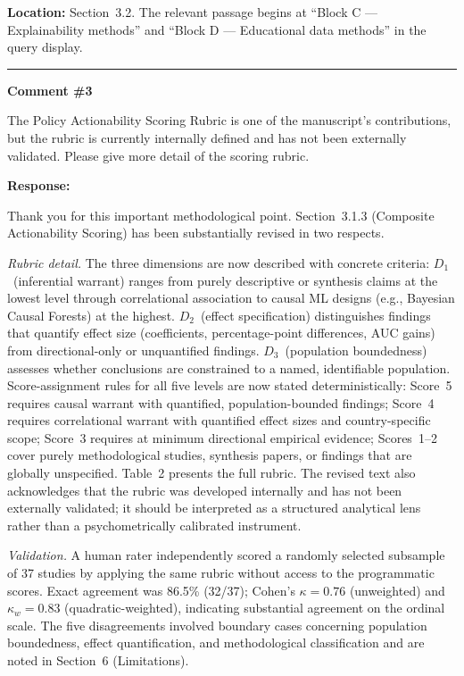 \documentclass[12pt, a4paper]{article}
\begin{document}
\medskip
\noindent\textbf{Location:} Section~3.2. The relevant passage begins at ``Block C --- Explainability
methods'' and ``Block D --- Educational data methods'' in the query display.

\bigskip\hrule\bigskip

\noindent\textbf{Comment \#3}

\medskip
\noindent\textcolor{reviewerblue}{%
The Policy Actionability Scoring Rubric is one of the manuscript's contributions, but the rubric
is currently internally defined and has not been externally validated. Please give more detail of
the scoring rubric.}

\medskip
\noindent\textbf{Response:}

Thank you for this important methodological point. Section~3.1.3 (Composite Actionability Scoring)
has been substantially revised in two respects.

\emph{Rubric detail.} The three dimensions are now described with concrete criteria:
$D_1$~(inferential warrant) ranges from purely descriptive or synthesis claims at the lowest level
through correlational association to causal ML designs (e.g., Bayesian Causal Forests) at the
highest. $D_2$~(effect specification) distinguishes findings that quantify effect size (coefficients,
percentage-point differences, AUC gains) from directional-only or unquantified findings.
$D_3$~(population boundedness) assesses whether conclusions are constrained to a named, identifiable
population. Score-assignment rules for all five levels are now stated deterministically: Score~5
requires causal warrant with quantified, population-bounded findings; Score~4 requires correlational
warrant with quantified effect sizes and country-specific scope; Score~3 requires at minimum
directional empirical evidence; Scores~1--2 cover purely methodological studies, synthesis papers,
or findings that are globally unspecified. Table~2 presents the full rubric. The revised text also
acknowledges that the rubric was developed internally and has not been externally validated; it
should be interpreted as a structured analytical lens rather than a psychometrically calibrated
instrument.

\emph{Validation.} A human rater independently scored a randomly selected subsample of 37 studies
by applying the same rubric without access to the programmatic scores. Exact agreement was
86.5\% (32/37); Cohen's $\kappa=0.76$ (unweighted) and $\kappa_w=0.83$ (quadratic-weighted),
indicating substantial agreement on the ordinal scale. The five disagreements involved boundary
cases concerning population boundedness, effect quantification, and methodological classification
and are noted in Section~6 (Limitations).
\end{document}

